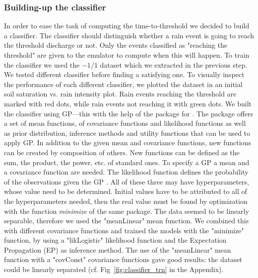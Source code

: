 \subsubsection{Building-up the classifier}
In order to ease the task of computing the time-to-threshold we decided to build a classifier.
The classifier should distinguish whether a rain event is going to reach the threshold discharge or not.
Only the events classified as "reaching the threshold" are given to the emulator to compute when this will happen.
To train the classifier we used the $\num{-1}/\num{1}$ dataset which we extracted in the previous step.
We tested different classifier before finding a satisfying one.
To visually inspect the performance of each different classifier, we plotted the dataset  in an initial soil saturation vs. rain intensity plot.
Rain events reaching the threshold are marked with red dots, while rain events not reaching it with green dots.
We built the classifier using GP---this with the help of the package  for .
The package offers a set of mean functions, of covariance functions and likelihood functions as well as prior distribution, inference methods and utility functions that can be used to apply GP.
In addition to the given mean and covariance functions, new functions can be created by composition of others.
New functions can be defined as the sum, the product, the power, etc. of standard ones.
To specify a GP a mean and a covariance function are needed.
The likelihood function defines the probability of the observations given the GP \autocite{rasmussen_gaussian_2010}.
All of these three may have hyperparameters, whose value need to be determined.
Initial values have to be attributed to all of the hyperparameters needed, then the real value must be found by optimization with the function \emph{minimize} of the same package.
The data seemed to be linearly separable, therefore we used the "meanLinear" mean function.
We combined this with different covariance functions and trained the models with the "minimize" function, by using a "likLogistic" likelihood function and the Expectation Propagation (EP) as inference method.
The use of the "meanLinear" mean function with a "covConst" covariance functions gave good results: the dataset could be linearly separated (cf. Fig~\ref{fig:classifier_trn} in the Appendix). 
